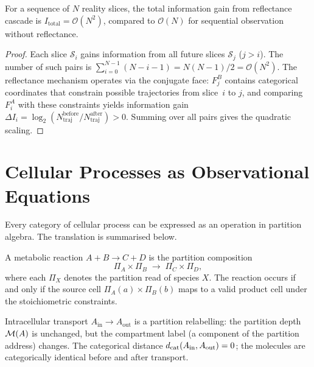 \begin{theorem}
\label{thm:reflectance}
For a sequence of $N$ reality slices, the total information gain from
reflectance cascade is $I_\mathrm{total} = \mathcal{O}(N^2)$, compared to
$\mathcal{O}(N)$ for sequential observation without reflectance.
\end{theorem}

\begin{proof}
Each slice $\mathcal{S}_i$ gains information from all future slices
$\mathcal{S}_j$ ($j > i$).  The number of such pairs is
$\sum_{i=0}^{N-1}(N-i-1) = N(N-1)/2 = \mathcal{O}(N^2)$.  The reflectance
mechanism operates via the conjugate face: $F_j^B$ contains categorical
coordinates that constrain possible trajectories from slice~$i$ to $j$, and
comparing $F_i^A$ with these constraints yields information gain
$\Delta I_i = \log_2(N_\mathrm{traj}^\mathrm{before}/N_\mathrm{traj}^\mathrm{after}) > 0$.
Summing over all pairs gives the quadratic scaling.
\end{proof}

\section{Cellular Processes as Observational Equations}
\label{sec:cellular-processes}

Every category of cellular process can be expressed as an operation in partition
algebra.  The translation is summarised below.

\begin{definition}
\label{def:metabolic-composition}
A metabolic reaction $A + B \to C + D$ is the partition composition
\[
    \Pi_A \times \Pi_B \;\longrightarrow\; \Pi_C \times \Pi_D,
\]
where each $\Pi_X$ denotes the partition read of species $X$.  The
reaction occurs if and only if the source cell $\Pi_A(a)\times\Pi_B(b)$
maps to a valid product cell under the stoichiometric constraints.
\end{definition}

\begin{definition}
\label{def:transport-relabel}
Intracellular transport $A_\mathrm{in}\to A_\mathrm{out}$ is a partition
relabelling: the partition depth $\mathcal{M}(A)$ is unchanged, but the
compartment label (a component of the partition address) changes.  The
categorical distance $d_{\mathrm{cat}}(A_\mathrm{in}, A_\mathrm{out}) = 0$; the
molecules are categorically identical before and after transport.
\end{definition}

